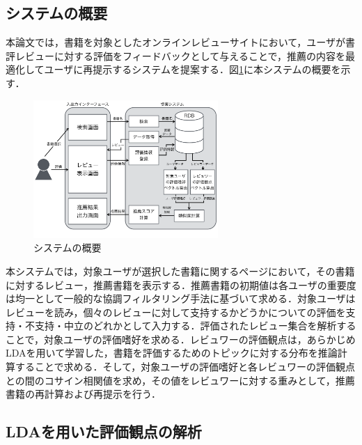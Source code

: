 \documentclass[a4paper,11pt,oneside,openany]{jsbook}
\begin{document}
\subsection{システムの概要}
本論文では，書籍を対象としたオンラインレビューサイトにおいて，ユーザが書評レビューに対する評価をフィードバックとして与えることで，推薦の内容を最適化してユーザに再提示するシステムを提案する．図\ref{fig:sys}に本システムの概要を示す．
\begin{figure}[tb]
\begin{center}
\includegraphics[width = 70mm]{figures/sys_image.pdf}
\end{center}
\caption{システムの概要}
\label{fig:sys}
\end{figure}
本システムでは，対象ユーザが選択した書籍に関するページにおいて，その書籍に対するレビュー，推薦書籍を表示する．推薦書籍の初期値は各ユーザの重要度は均一として一般的な協調フィルタリング手法に基づいて求める．対象ユーザはレビューを読み，個々のレビューに対して支持するかどうかについての評価を支持・不支持・中立のどれかとして入力する．評価されたレビュー集合を解析することで，対象ユーザの評価嗜好を求める．レビュワーの評価観点は，あらかじめLDAを用いて学習した，書籍を評価するためのトピックに対する分布を推論計算することで求める．そして，対象ユーザの評価嗜好と各レビュワーの評価観点との間のコサイン相関値を求め，その値をレビュワーに対する重みとして，推薦書籍の再計算および再提示を行う．
\subsection{LDAを用いた評価観点の解析}
\end{document}
